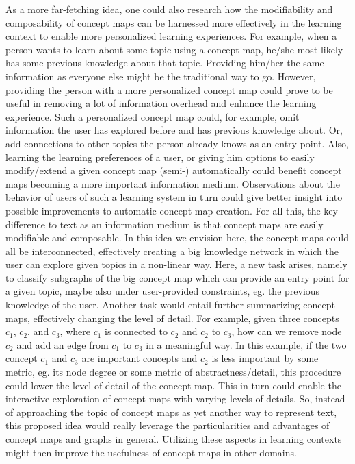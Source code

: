 As a more far-fetching idea, one could also research how the modifiability and composability of concept maps can be harnessed more effectively in the learning context to enable more personalized learning experiences.
For example, when a person wants to learn about some topic using a concept map, he/she most likely has some previous knowledge about that topic.
Providing him/her the same information as everyone else might be the traditional way to go. 
However, providing the person with a more personalized concept map could prove to be useful in removing a lot of information overhead and enhance the learning experience.
Such a personalized concept map could, for example, omit information the user has explored before and has previous knowledge about.
Or, add connections to other topics the person already knows as an entry point.
Also, learning the learning preferences of a user, or giving him options to easily modify/extend a given concept map (semi-) automatically could benefit concept maps becoming a more important information medium.
Observations about the behavior of users of such a learning system in turn could give better insight into possible improvements to automatic concept map creation.
For all this, the key difference to text as an information medium is that concept maps are easily modifiable and composable.
In this idea we envision here, the concept maps could all be interconnected, effectively creating a big knowledge network in which the user can explore given topics in a non-linear way.
Here, a new task arises, namely to classify subgraphs of the big concept map which can provide an entry point for a given topic, maybe also under user-provided constraints, eg. the previous knowledge of the user.
Another task would entail further summarizing concept maps, effectively changing the level of detail.
For example, given three concepts $c_1$, $c_2$, and $c_3$, where $c_1$ is connected to $c_2$ and $c_2$ to $c_3$, how can we remove node $c_2$ and add an edge from $c_1$ to $c_3$ in a meaningful way.
In this example, if the two concept $c_1$ and $c_3$ are important concepts and $c_2$ is less important by some metric, eg. its node degree or some metric of abstractness/detail, this procedure could lower the level of detail of the concept map.
This in turn could enable the interactive exploration of concept maps with varying levels of details.
So, instead of approaching the topic of concept maps as yet another way to represent text, this proposed idea would really leverage the particularities and advantages of concept maps and graphs in general.
Utilizing these aspects in learning contexts might then improve the usefulness of concept maps in other domains.